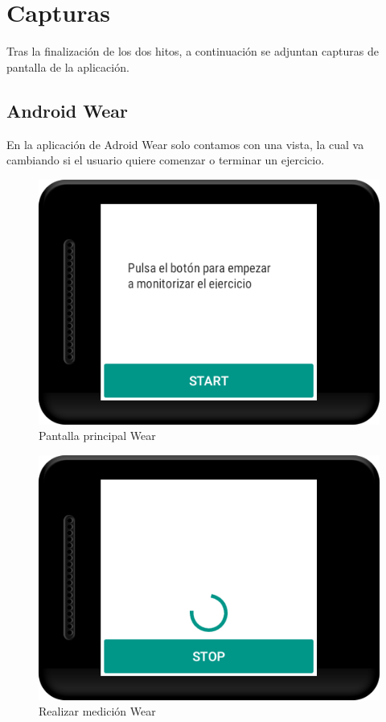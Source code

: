 \section{Capturas}

Tras la finalización de los dos hitos, a continuación se adjuntan capturas de pantalla de la aplicación.

\subsection*{Android Wear}

En la aplicación de Adroid Wear solo contamos con una vista, la cual va cambiando si el usuario quiere comenzar o terminar un ejercicio.

\begin{figure}[H]
	\centering
	\includegraphics[scale=0.4]{imagenes/w1.png}
	\caption{Pantalla principal Wear}
	\label{Pantalla principal Wear}
\end{figure}

\begin{figure}[H]
	\centering
	\includegraphics[scale=0.4]{imagenes/w2.png}
	\caption{Realizar medición Wear}
	\label{Realizar medición Wear}
\end{figure}

